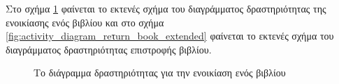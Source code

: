 \documentclass{assignment}
\begin{document}
Στο σχήμα \ref{fig:activity_diagram_rent_book_extended} φαίνεται το εκτενές σχήμα του διαγράμματος δραστηριότητας της ενοικίασης ενός βιβλίου και στο σχήμα \ref{fig:activity_diagram_reτurn_book_extended} φαίνεται το εκτενές σχήμα του διαγράμματος δραστηριότητας επιστροφής βιβλίου.
\begin{figure}
\begin{center}
\caption{Το διάγραμμα δραστηριότητας για την ενοικίαση ενός βιβλίου}
\label{fig:activity_diagram_rent_book_extended}
\end{center}
\end{figure}
\end{document}
